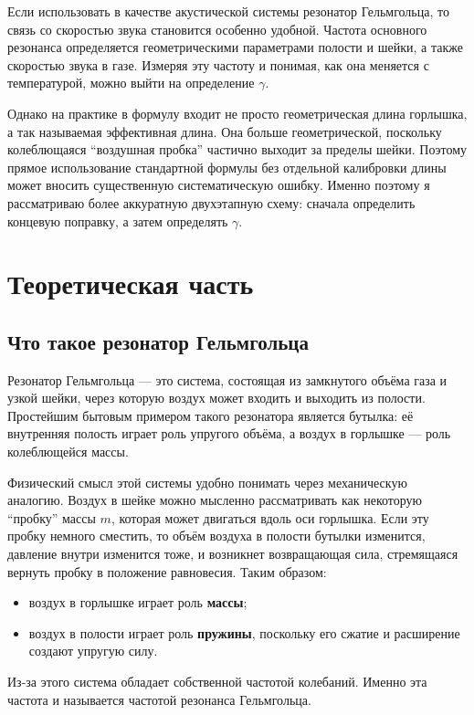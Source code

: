 \documentclass[a4paper,12pt]{article}
\begin{document}
	Если использовать в качестве акустической системы резонатор Гельмгольца, то связь со скоростью звука становится особенно удобной. Частота основного резонанса определяется геометрическими параметрами полости и шейки, а также скоростью звука в газе. Измеряя эту частоту и понимая, как она меняется с температурой, можно выйти на определение \(\gamma\).
	
	Однако на практике в формулу входит не просто геометрическая длина горлышка, а так называемая эффективная длина. Она больше геометрической, поскольку колеблющаяся ``воздушная пробка'' частично выходит за пределы шейки. Поэтому прямое использование стандартной формулы без отдельной калибровки длины может вносить существенную систематическую ошибку. Именно поэтому я рассматриваю более аккуратную двухэтапную схему: сначала определить концевую поправку, а затем определять \(\gamma\).
	
	\section{Теоретическая часть}
	
	\subsection{Что такое резонатор Гельмгольца}
	
	Резонатор Гельмгольца --- это система, состоящая из замкнутого объёма газа и узкой шейки, через которую воздух может входить и выходить из полости. Простейшим бытовым примером такого резонатора является бутылка: её внутренняя полость играет роль упругого объёма, а воздух в горлышке --- роль колеблющейся массы.
	
	Физический смысл этой системы удобно понимать через механическую аналогию. Воздух в шейке можно мысленно рассматривать как некоторую ``пробку'' массы \(m\), которая может двигаться вдоль оси горлышка. Если эту пробку немного сместить, то объём воздуха в полости бутылки изменится, давление внутри изменится тоже, и возникнет возвращающая сила, стремящаяся вернуть пробку в положение равновесия. Таким образом:
	\begin{itemize}
		\item воздух в горлышке играет роль \textbf{массы};
		\item воздух в полости играет роль \textbf{пружины}, поскольку его сжатие и расширение создают упругую силу.
	\end{itemize}
	
	Из-за этого система обладает собственной частотой колебаний. Именно эта частота и называется частотой резонанса Гельмгольца.
	
\end{document}
